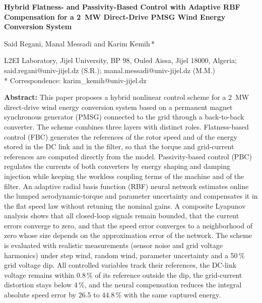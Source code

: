 \documentclass[11pt,a4paper]{article}
\begin{document}
\begin{center}
{\LARGE\bfseries Hybrid Flatness- and Passivity-Based Control with Adaptive RBF Compensation for a 2~MW Direct-Drive PMSG Wind Energy Conversion System\par}
\vspace{12pt}
{\large Said Regani, Manal Messadi and Karim Kemih\,*\par}
\vspace{6pt}
{\small L2EI Laboratory, Jijel University, BP 98, Ouled Aissa, Jijel 18000, Algeria;\\
said.regani@univ-jijel.dz (S.R.); manal.messadi@univ-jijel.dz (M.M.)\\
* Correspondence: karim\_kemih@univ-jijel.dz\par}
\end{center}

\vspace{6pt}
\noindent\textbf{Abstract:} This paper proposes a hybrid nonlinear control scheme for a 2~MW direct-drive
wind energy conversion system based on a permanent magnet synchronous generator (PMSG) connected to the
grid through a back-to-back converter. The scheme combines three layers with distinct roles.
Flatness-based control (FBC) generates the references of the rotor speed and of the energy stored in the
DC link and in the filter, so that the torque and grid-current references are computed directly from the
model. Passivity-based control (PBC) regulates the currents of both converters by energy shaping and
damping injection while keeping the workless coupling terms of the machine and of the filter. An adaptive
radial basis function (RBF) neural network estimates online the lumped aerodynamic-torque and parameter
uncertainty and compensates it in the flat speed law without retuning the nominal gains. A composite
Lyapunov analysis shows that all closed-loop signals remain bounded, that the current errors converge to
zero, and that the speed error converges to a neighborhood of zero whose size depends on the
approximation error of the network. The scheme is evaluated with realistic measurements (sensor noise
and grid voltage harmonics) under step wind, random wind, parameter uncertainty and a 50\,\% grid
voltage dip. All controlled variables track their references, the DC-link voltage remains within
0.8\,\% of its reference outside the dip, the grid-current distortion stays below 4\,\%, and the neural
compensation reduces the integral absolute speed error by 26.5 to 44.8\,\% with the same captured energy.
\end{document}

